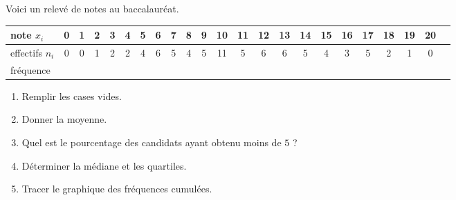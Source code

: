 
\begin{exercice}\label{exoSeconde-0014}

    Voici un relevé de notes au baccalauréat.
    \begin{center}
        \begin{tabular}{|l||c|c|c|c|c|c|c|c|c|c|c|c|c|c|c|c|c|c|c|c|c||c|}
            \hline
            note \( x_i\)&0&1&2&3&4&5&6&7&8&9&10&11&12&13&14&15&16&17&18&19&20\\
            \hline
            effectifs \( n_i\)&0&0&1&2&2&4&6&5&4&5&11&5&6&6&5&4&3&5&2&1&0\\
            \hline
            fréquence&&&&&&&&&&&&&&&&&&&&&\\
            \hline
        \end{tabular}
    \end{center}
    \begin{enumerate}
        \item
            Remplir les cases vides.
        \item
            Donner la moyenne.
        \item
            Quel est le pourcentage des candidats ayant obtenu moins de \( 5\) ?
        \item
            Déterminer la médiane et les quartiles.
        \item
            Tracer le graphique des fréquences cumulées.
    \end{enumerate}

    


\end{exercice}
